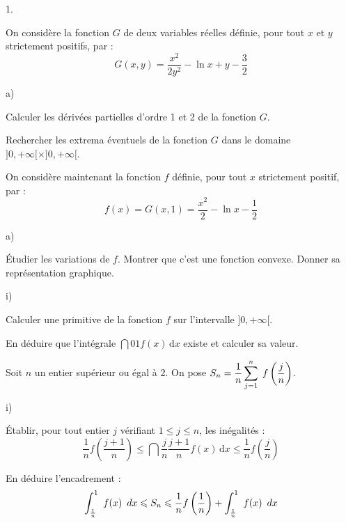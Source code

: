 \documentclass[11pt]{article}%
\begin{document}
\begin{noliste}{1.}
 \setlength{\itemsep}{4mm}
\item On considère la fonction $G$ de deux variables réelles définie,
pour
tout $x$ et $y$ strictement positifs, par : 
\[
G(x,y) = \dfrac{x^{2}}{2y^{2}}-\ln x + y-\dfrac{3}{2}
\]

\begin{noliste}{a)}
 \setlength{\itemsep}{2mm}
\item Calculer les dérivées partielles d'ordre 1 et 2 de la fonction
$G$.

\item Rechercher les extrema éventuels de la fonction $G$ dans le
domaine $]0, + \infty \lbrack \times ]0, + \infty \lbrack $.
\end{noliste}

\item On considère maintenant la fonction $f$ définie, pour tout $x$
strictement positif, par : 
\[
f(x) = G(x,1) = \dfrac{x^{2}}{2}-\ln x-\dfrac{1}{2}
\]

\begin{noliste}{a)}
 \setlength{\itemsep}{2mm}
\item Étudier les variations de $f$. Montrer que c'est une fonction
convexe.
Donner sa représentation graphique.

\item 

\begin{nonoliste}{i)}
\item Calculer une primitive de la fonction $f$ sur l'intervalle $]0, +
\infty
\lbrack $.

\item En déduire que l'intégrale $\dint{0}{1}f(x)\,\text{d}x$ existe
et calculer sa valeur.
\end{nonoliste}

\item Soit $n$ un entier supérieur ou égal à 2. On pose $S_{n} =
\dfrac{1}{n}\displaystyle\sum\limits_{j = 1}^{n}\hspace{.1cm}f\left(\dfrac{j}{n}\right)$.

\begin{nonoliste}{i)}
\item Établir, pour tout entier $j$ vérifiant $1\leq j\leq n$, les
inégalités : 
\[
\dfrac{1}{n}f\left( \dfrac{j + 1}{n}\right) \leq
\dint{\frac{j}{n}}{\frac{j + 1}{n}}f(x)\,\text{d}x\leq
\dfrac{1}{n}f\left( \dfrac{j}{n}\right) 
\]

\item En déduire l'encadrement : 
\[
\displaystyle \int_{\frac{1}{n}}^{1}\ f(x)\,\ dx\leqslant S_{n}\leqslant \dfrac{1}{n}f\left(
\dfrac{1}{n}\right) + \displaystyle \int_{\frac{1}{n}}^{1}\ f(x)\,\ dx
\]


\end{nonoliste}
\end{noliste}
\end{noliste}
\end{document}
